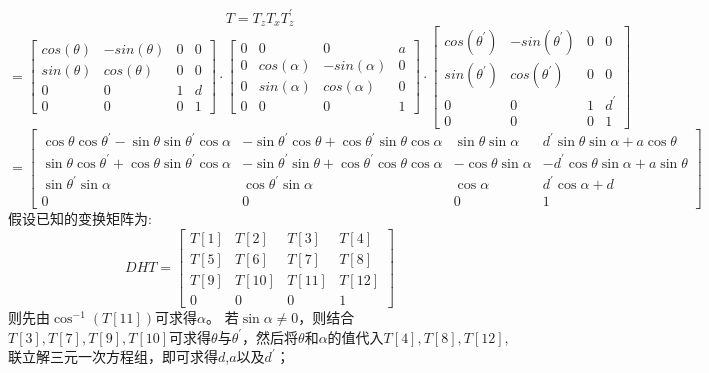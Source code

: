 \documentclass{article}
\begin{document}
\begin{CJK}{UTF8}{song}
$$T=T_zT_xT_z^\prime$$
$$={
\left[ \begin{array}{cccc}
         cos(\theta) & -sin(\theta) & 0 & 0 \\
         sin(\theta) & cos(\theta) & 0 & 0 \\
         0 & 0 & 1 & d \\
         0 & 0 & 0 & 1
       \end{array}
\right ]\cdot
\left[ \begin{array}{cccc}
         0 & 0 & 0 & a \\
         0 & cos(\alpha) & -sin(\alpha) & 0 \\
         0 & sin(\alpha) & cos(\alpha) & 0 \\
         0 & 0 & 0 & 1
       \end{array}
\right ]\cdot
\left[ \begin{array}{cccc}
         cos(\theta^\prime) & -sin(\theta^\prime) & 0 & 0 \\
         sin(\theta^\prime) & cos(\theta^\prime) & 0 & 0 \\
         0 & 0 & 1 & d^\prime \\
         0 & 0 & 0 & 1
       \end{array}
\right ]
}
$$
$$
={
\left[ \begin{array}{cccc}
         \cos\theta\cos\theta^\prime-\sin\theta\sin\theta^\prime\cos\alpha & -\sin\theta^\prime\cos\theta+\cos\theta^\prime\sin\theta\cos\alpha & \sin\theta\sin\alpha & d^\prime\sin\theta\sin\alpha+a\cos\theta \\
         \sin\theta\cos\theta^\prime+\cos\theta\sin\theta^\prime\cos\alpha & -\sin\theta^\prime\sin\theta+\cos\theta^\prime\cos\theta\cos\alpha & -\cos\theta\sin\alpha & -d^\prime\cos\theta\sin\alpha+a\sin\theta \\
         \sin\theta^\prime\sin\alpha & \cos\theta^\prime\sin\alpha & \cos\alpha & d^\prime\cos\alpha+d \\
         0 & 0 & 0 & 1
       \end{array}
\right]
}
$$
假设已知的变换矩阵为:
$$
DHT={
\left[ \begin{array}{cccc}
         T[1]& T[2] & T[3] & T[4] \\
         T[5]& T[6] & T[7] & T[8] \\
         T[9]& T[10] & T[11] & T[12] \\
         0 & 0 & 0 & 1
       \end{array}
\right]
}
$$
则先由$\cos^{-1}(T[11])$可求得$\alpha$。
若$\sin\alpha\neq0$，则结合$T[3],T[7],T[9],T[10]$可求得$\theta$与$\theta^\prime$，然后将$\theta$和$\alpha$的值代入$T[4],T[8],T[12]$,联立解三元一次方程组，即可求得$d$,$a$以及$d^\prime$；

\end{CJK}
\end{document}
